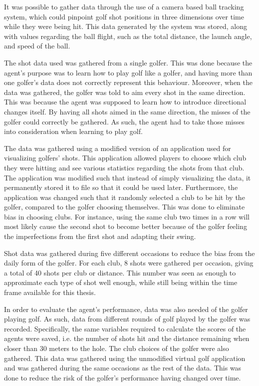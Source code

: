 \documentclass{kththesis}
\begin{document}
It was possible to gather data through the use of a camera based ball tracking system, which could pinpoint golf shot positions in three dimensions over time while they were being hit. This data generated by the system was stored, along with values regarding the ball flight, such as the total distance, the launch angle, and speed of the ball. 

The shot data used was gathered from a single golfer. This was done because the agent's purpose was to learn how to play golf like a golfer, and having more than one golfer's data does not correctly represent this behaviour. Moreover, when the data was gathered, the golfer was told to aim every shot in the same direction. This was because the agent was supposed to learn how to introduce directional changes itself. By having all shots aimed in the same direction, the misses of the golfer could correctly be gathered. As such, the agent had to take those misses into consideration when learning to play golf.

The data was gathered using a modified version of an application used for visualizing golfers' shots. This application allowed players to choose which club they were hitting and see various statistics regarding the shots from that club. The application was modified such that instead of simply visualizing the data, it permanently stored it to file so that it could be used later. Furthermore, the application was changed such that it randomly selected a club to be hit by the golfer, compared to the golfer choosing themselves. This was done to eliminate bias in choosing clubs. For instance, using the same club two times in a row will most likely cause the second shot to become better because of the golfer feeling the imperfections from the first shot and adapting their swing.

Shot data was gathered during five different occasions to reduce the bias from the daily form of the golfer. For each club, 8 shots were gathered per occasion, giving a total of 40 shots per club or distance. This number was seen as enough to approximate each type of shot well enough, while still being within the time frame available for this thesis. 

In order to evaluate the agent's performance, data was also needed of the golfer playing golf. As such, data from different rounds of golf played by the golfer was recorded. Specifically, the same variables required to calculate the scores of the agents were saved, i.e. the number of shots hit and the distance remaining when closer than 30 meters to the hole. The club choices of the golfer were also gathered. This data was gathered using the unmodified virtual golf application and was gathered during the same occasions as the rest of the data. This was done to reduce the risk of the golfer's performance having changed over time. 
\end{document}
